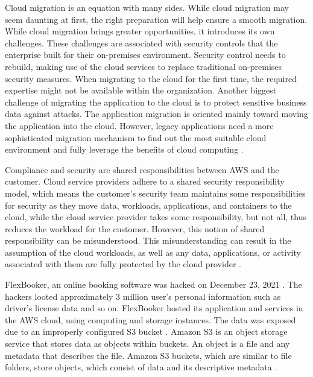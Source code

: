 \par Cloud migration is an equation with many sides. While cloud migration may seem daunting at first, the right preparation will help ensure a smooth migration. While cloud migration brings greater opportunities, it introduces its own challenges. These challenges are associated with security controls that the enterprise built for their on-premises environment. Security control needs to rebuild, making use of the cloud services to replace traditional on-premises security measures. When migrating to the cloud for the first time, the required expertise might not be available within the organization. Another biggest challenge of migrating the application to the cloud is to protect sensitive business data against attacks. The application migration is oriented mainly toward moving the application into the cloud. However, legacy applications need a more sophisticated migration mechanism to find out the most suitable cloud environment and fully leverage the benefits of cloud computing \cite{4}.

\par Compliance and security are shared responsibilities between AWS and the customer. Cloud service providers adhere to a shared security responsibility model, which means the customer’s security team maintains some responsibilities for security as they move data, workloads, applications, and containers to the cloud, while the cloud service provider takes some responsibility, but not all, thus reduces the workload for the customer. However, this notion of shared responsibility can be misunderstood. This misunderstanding can result in the assumption of the cloud workloads, as well as any data, applications, or activity associated with them are fully protected by the cloud provider \cite{5}.



\par FlexBooker, an online booking software was hacked on December 23, 2021 \cite{6}\cite{7}. The hackers looted approximately 3 million user's personal information such as driver's license data and so on. FlexBooker hosted its application and services in the AWS cloud, using computing and storage instances. The data was exposed due to an improperly configured S3 bucket \cite{8}. Amazon S3 is an object storage service that stores data as objects within buckets. An object is a file and any metadata that describes the file. Amazon S3 buckets, which are similar to file folders, store objects, which consist of data and its descriptive metadata \cite{9}.



